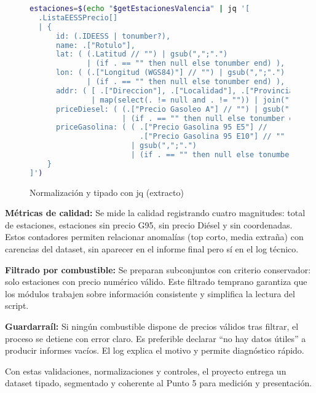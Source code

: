 \begin{figure}[H]
  \footnotesize
  \begin{lstlisting}[language=bash]
estaciones=$(echo "$getEstacionesValencia" | jq '[
  .ListaEESSPrecio[]
  | {
      id: (.IDEESS | tonumber?),
      name: .["Rotulo"],
      lat: ( (.Latitud // "") | gsub(",";".") 
             | (if . == "" then null else tonumber end) ),
      lon: ( (.["Longitud (WGS84)"] // "") | gsub(",";".") 
             | (if . == "" then null else tonumber end) ),
      addr: ( [ .["Direccion"], .["Localidad"], .["Provincia"] ] 
              | map(select(. != null and . != "")) | join(", ") ),
      priceDiesel: ( (.["Precio Gasoleo A"] // "") | gsub(",";".") 
                     | (if . == "" then null else tonumber end) ),
      priceGasolina: ( ( .["Precio Gasolina 95 E5"] // 
                         .["Precio Gasolina 95 E10"] // "" )
                       | gsub(",";".") 
                       | (if . == "" then null else tonumber end) )
    }
]')
\end{lstlisting}
  \caption{Normalización y tipado con jq (extracto)}
\end{figure}

\textbf{Métricas de calidad:} Se mide la calidad registrando cuatro magnitudes: total de estaciones, estaciones sin precio G95, sin precio Diésel y sin coordenadas. Estos contadores permiten relacionar anomalías (top corto, media extraña) con carencias del dataset, sin aparecer en el informe final pero sí en el log técnico.

\textbf{Filtrado por combustible:} Se preparan subconjuntos con criterio conservador: solo estaciones con precio numérico válido. Este filtrado temprano garantiza que los módulos trabajen sobre información consistente y simplifica la lectura del script.

\textbf{Guardarraíl:} Si ningún combustible dispone de precios válidos tras filtrar, el proceso se detiene con error claro. Es preferible declarar ``no hay datos útiles'' a producir informes vacíos. El log explica el motivo y permite diagnóstico rápido.

Con estas validaciones, normalizaciones y controles, el proyecto entrega un dataset tipado, segmentado y coherente al Punto 5 para medición y presentación.

